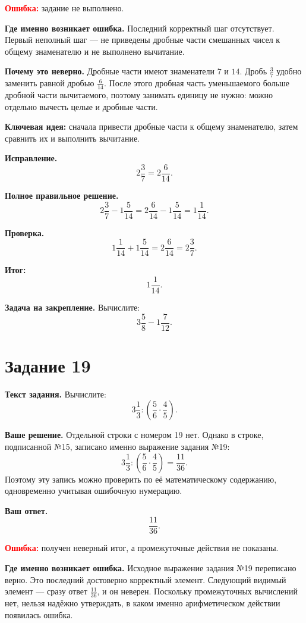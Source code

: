 \documentclass[12pt,a4paper]{article}
\begin{document}
\textcolor{red}{\textbf{Ошибка:}} задание не выполнено.

\textbf{Где именно возникает ошибка.}
Последний корректный шаг отсутствует. Первый неполный шаг --- не приведены дробные части смешанных чисел к общему знаменателю и не выполнено вычитание.

\textbf{Почему это неверно.}
Дробные части имеют знаменатели $7$ и $14$. Дробь $\frac37$ удобно заменить равной дробью $\frac6{14}$. После этого дробная часть уменьшаемого больше дробной части вычитаемого, поэтому занимать единицу не нужно: можно отдельно вычесть целые и дробные части.

\textcolor{blue!60!black}{\textbf{Ключевая идея:}} сначала привести дробные части к общему знаменателю, затем сравнить их и выполнить вычитание.

\textbf{Исправление.}
\[
2\frac37=2\frac6{14}.
\]

\textbf{Полное правильное решение.}
\[
2\frac37-1\frac5{14}
=2\frac6{14}-1\frac5{14}
=1\frac1{14}.
\]

\textbf{Проверка.}
\[
1\frac1{14}+1\frac5{14}
=2\frac6{14}
=2\frac37.
\]

\textcolor{teal!60!black}{\textbf{Итог:}}
\[
\boxed{1\frac1{14}}.
\]

\textbf{Задача на закрепление.}
Вычислите:
\[
3\frac58-1\frac7{12}.
\]

\newpage
{}\label{task:19}
\section*{Задание 19}

\textbf{Текст задания.}
Вычислите:
\[
3\frac13:\left(\frac56\cdot\frac45\right).
\]

\textbf{Ваше решение.}
Отдельной строки с номером 19 нет. Однако в строке, подписанной №15, записано именно выражение задания №19:
\[
3\frac13:\left(\frac56\cdot\frac45\right)=\frac{11}{36}.
\]
Поэтому эту запись можно проверить по её математическому содержанию, одновременно учитывая ошибочную нумерацию.

\textbf{Ваш ответ.}
\[
\frac{11}{36}.
\]

\textcolor{red}{\textbf{Ошибка:}} получен неверный итог, а промежуточные действия не показаны.

\textbf{Где именно возникает ошибка.}
Исходное выражение задания №19 переписано верно. Это последний достоверно корректный элемент. Следующий видимый элемент --- сразу ответ $\frac{11}{36}$, и он неверен. Поскольку промежуточных вычислений нет, нельзя надёжно утверждать, в каком именно арифметическом действии появилась ошибка.
\end{document}
